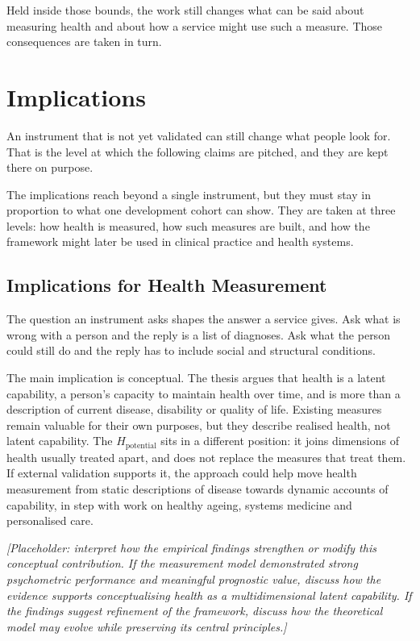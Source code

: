 Held inside those bounds, the work still changes what can be said about measuring
health and about how a service might use such a measure. Those consequences are
taken in turn.

\section{Implications}
\label{sec:disc-implications}

\noindent An instrument that is not yet validated can still change what people
look for. That is the level at which the following claims are pitched, and they
are kept there on purpose.

\noindent The implications reach beyond a single instrument, but they must stay in proportion to what one development cohort can show. They are taken at three levels: how health is measured, how such measures are built, and how the framework might later be used in clinical practice and health systems.

\subsection{Implications for Health Measurement}
\label{sec:disc-impl-measurement}

The question an instrument asks shapes the answer a service gives. Ask what is
wrong with a person and the reply is a list of diagnoses. Ask what the person
could still do and the reply has to include social and structural conditions.

The main implication is conceptual. The thesis argues that health is a latent capability, a person's capacity to maintain health over time, and is more than a description of current disease, disability or quality of life. Existing measures remain valuable for their own purposes, but they describe realised health, not latent capability. The $H_{\text{potential}}$ sits in a different position: it joins dimensions of health usually treated apart, and does not replace the measures that treat them. If external validation supports it, the approach could help move health measurement from static descriptions of disease towards dynamic accounts of capability, in step with work on healthy ageing, systems medicine and personalised care.

\medskip
\noindent\emph{[Placeholder: interpret how the empirical findings strengthen or modify this conceptual contribution. If the measurement model demonstrated strong psychometric performance and meaningful prognostic value, discuss how the evidence supports conceptualising health as a multidimensional latent capability. If the findings suggest refinement of the framework, discuss how the theoretical model may evolve while preserving its central principles.]}

